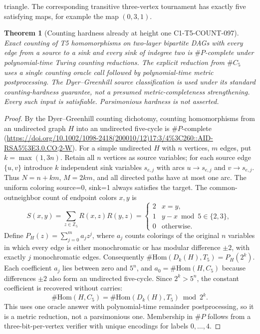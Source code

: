 \documentclass[11pt]{article}
\newtheorem{theorem}{Theorem}
\begin{document}
triangle. The corresponding transitive three-vertex
tournament has exactly five satisfying maps, for example
the map $(0,3,1)$.
\begin{theorem}[Counting hardness already at height one C1-T5-COUNT-097]
Exact counting of T5 homomorphisms on two-layer bipartite
DAGs with every edge from a source to a sink and every
sink of indegree two is $\#P$-complete under
\emph{polynomial-time Turing counting reductions}. The
explicit reduction from $\#C_5$ uses a single counting
oracle call followed by polynomial-time metric
postprocessing. The Dyer--Greenhill source classification
is used under its standard counting-hardness guarantee,
not a presumed metric-completeness strengthening.
Every such input is satisfiable. Parsimonious
hardness is not asserted.
\end{theorem}
\begin{proof}
By the Dyer--Greenhill counting dichotomy, counting
homomorphisms from an undirected graph $H$ into an
undirected five-cycle is $\#P$-complete
(\url{https://doi.org/10.1002/1098-2418(200010/12)17:3/4%3C260::AID-RSA5%3E3.0.CO;2-W}).
For a simple undirected $H$ with $n$ vertices, $m$ edges,
put $k=\max(1,3n)$. Retain all $n$ vertices as source
variables; for each source edge $\{u,v\}$ introduce $k$
independent sink variables $s_{e,j}$ with arcs
$u\to s_{e,j}$ and $v\to s_{e,j}$. Thus
$N=n+km$, $M=2km$, and all directed paths have at most one
arc. The uniform coloring source=0, sink=1 always satisfies
the target.
The common-outneighbor count of endpoint colors $x,y$ is
\[
S(x,y)=\sum_{z\in\mathbb Z_5}R(x,z)R(y,z)=
\begin{cases}
2&x=y,\\
1&y-x\bmod5\in\{2,3\},\\
0&\text{otherwise}.
\end{cases}
\]
Define $P_H(z)=\sum_{j=0}^m a_j z^j$, where $a_j$ counts
colorings of the original $n$ variables in which every
edge is either monochromatic or has modular difference
$\pm2$, with exactly $j$ monochromatic edges.
Consequently
$\#\mathrm{Hom}(D_k(H),T_5)=P_H(2^k)$.
Each coefficient $a_j$ lies between zero and $5^n$,
and $a_0=\#\mathrm{Hom}(H,C_5)$ because differences
$\pm2$ also form an undirected five-cycle.
Since $2^k>5^n$, the constant coefficient is recovered
without carries:
\[
\boxed{\#\mathrm{Hom}(H,C_5)=
\#\mathrm{Hom}(D_k(H),T_5)\bmod2^k.}
\]
This uses one oracle answer with polynomial-time remainder
postprocessing, so it is a metric reduction, not a
parsimonious one. Membership in $\#P$ follows from a
three-bit-per-vertex verifier with unique encodings for
labels $0,\ldots,4$.
\end{proof}
\end{document}

